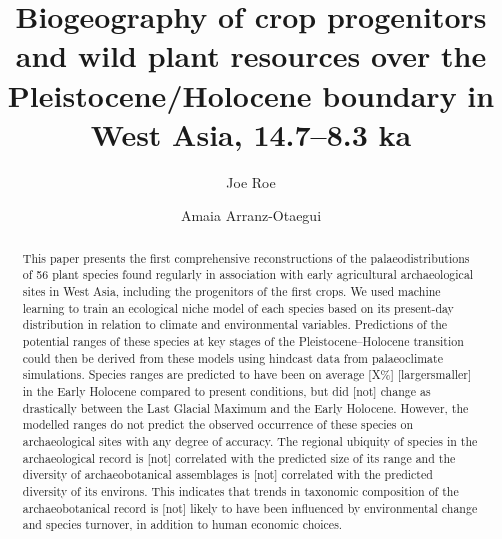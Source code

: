 \documentclass[
  authoryear,
  review]{elsarticle}
\begin{document}
\begin{frontmatter}
\title{Biogeography of crop progenitors and wild plant resources over
the Pleistocene/Holocene boundary in West Asia, 14.7--8.3 ka}
\author[1,2]{Joe Roe%
%
}
\author[3]{Amaia Arranz-Otaegui%
%
}





        
\begin{abstract}
This paper presents the first comprehensive reconstructions of the
palaeodistributions of 56 plant species found regularly in association
with early agricultural archaeological sites in West Asia, including the
progenitors of the first crops. We used machine learning to train an
ecological niche model of each species based on its present-day
distribution in relation to climate and environmental variables.
Predictions of the potential ranges of these species at key stages of
the Pleistocene--Holocene transition could then be derived from these
models using hindcast data from palaeoclimate simulations. Species
ranges are predicted to have been on average {[}X\%{]}
{[}larger\textbar smaller{]} in the Early Holocene compared to present
conditions, but did {[}not{]} change as drastically between the Last
Glacial Maximum and the Early Holocene. However, the modelled ranges do
not predict the observed occurrence of these species on archaeological
sites with any degree of accuracy. The regional ubiquity of species in
the archaeological record is {[}not{]} correlated with the predicted
size of its range and the diversity of archaeobotanical assemblages is
{[}not{]} correlated with the predicted diversity of its environs. This
indicates that trends in taxonomic composition of the archaeobotanical
record is {[}not{]} likely to have been influenced by environmental
change and species turnover, in addition to human economic choices.
\end{abstract}





\end{frontmatter}
    
\end{document}
